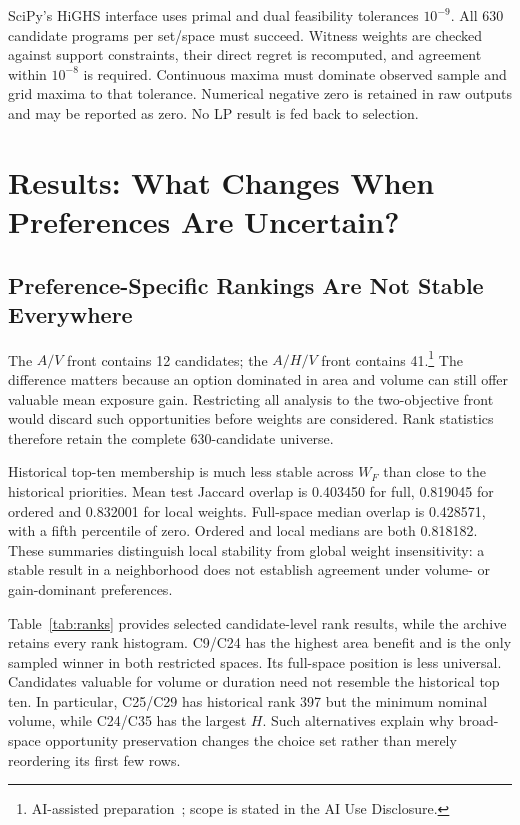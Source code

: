 \documentclass{llncs}
\newcommand{\aidraft}{\footnote{AI-assisted preparation~\cite{openai2026}; scope is stated in the AI Use Disclosure.}}
\begin{document}
SciPy's HiGHS interface uses primal and dual feasibility tolerances $10^{-9}$. All 630 candidate programs per set/space must succeed. Witness weights are checked against support constraints, their direct regret is recomputed, and agreement within $10^{-8}$ is required. Continuous maxima must dominate observed sample and grid maxima to that tolerance. Numerical negative zero is retained in raw outputs and may be reported as zero. No LP result is fed back to selection.

\section{Results: What Changes When Preferences Are Uncertain?}
\subsection{Preference-Specific Rankings Are Not Stable Everywhere}
The $A/V$ front contains 12 candidates; the $A/H/V$ front contains 41.\aidraft{} The difference matters because an option dominated in area and volume can still offer valuable mean exposure gain. Restricting all analysis to the two-objective front would discard such opportunities before weights are considered. Rank statistics therefore retain the complete 630-candidate universe.

Historical top-ten membership is much less stable across $W_F$ than close to the historical priorities. Mean test Jaccard overlap is 0.403450 for full, 0.819045 for ordered and 0.832001 for local weights. Full-space median overlap is 0.428571, with a fifth percentile of zero. Ordered and local medians are both 0.818182. These summaries distinguish local stability from global weight insensitivity: a stable result in a neighborhood does not establish agreement under volume- or gain-dominant preferences.



Table~\ref{tab:ranks} provides selected candidate-level rank results, while the archive retains every rank histogram. C9/C24 has the highest area benefit and is the only sampled winner in both restricted spaces. Its full-space position is less universal. Candidates valuable for volume or duration need not resemble the historical top ten. In particular, C25/C29 has historical rank 397 but the minimum nominal volume, while C24/C35 has the largest $H$. Such alternatives explain why broad-space opportunity preservation changes the choice set rather than merely reordering its first few rows.
\end{document}

